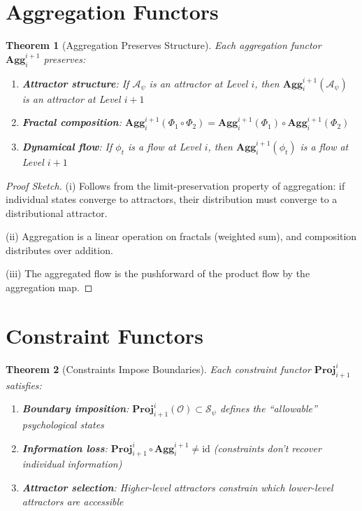 \documentclass[11pt,twoside]{book}
\newcommand{\Frac}{\Phi}
\newcommand{\PsychAttractor}{\mathcal{A}_\psi}
\newcommand{\Overton}{\mathcal{O}}
\newcommand{\Aggregate}[2]{\mathbf{Agg}_{#1}^{#2}}
\newcommand{\Project}[2]{\mathbf{Proj}_{#1}^{#2}}
\newtheorem{theorem}{Theorem}[chapter]
\begin{document}
\section{Aggregation Functors}

\begin{theorem}[Aggregation Preserves Structure]
\label{thm:agg-structure}
Each aggregation functor $\Aggregate{i}{i+1}$ preserves:
\begin{enumerate}[label=(\roman*)]
    \item \textbf{Attractor structure}: If $\PsychAttractor$ is an attractor at Level $i$,
          then $\Aggregate{i}{i+1}(\PsychAttractor)$ is an attractor at Level $i+1$
    \item \textbf{Fractal composition}: $\Aggregate{i}{i+1}(\Frac_1 \circ \Frac_2) =
          \Aggregate{i}{i+1}(\Frac_1) \circ \Aggregate{i}{i+1}(\Frac_2)$
    \item \textbf{Dynamical flow}: If $\phi_t$ is a flow at Level $i$, then
          $\Aggregate{i}{i+1}(\phi_t)$ is a flow at Level $i+1$
\end{enumerate}
\end{theorem}

\begin{proof}[Proof Sketch]
(i) Follows from the limit-preservation property of aggregation: if individual states
converge to attractors, their distribution must converge to a distributional attractor.

(ii) Aggregation is a linear operation on fractals (weighted sum), and composition
distributes over addition.

(iii) The aggregated flow is the pushforward of the product flow by the aggregation map.
\end{proof}

\section{Constraint Functors}

\begin{theorem}[Constraints Impose Boundaries]
\label{thm:constraint-bounds}
Each constraint functor $\Project{i+1}{i}$ satisfies:
\begin{enumerate}[label=(\roman*)]
    \item \textbf{Boundary imposition}: $\Project{i+1}{i}(\Overton) \subset \mathcal{S}_\psi$
          defines the ``allowable'' psychological states
    \item \textbf{Information loss}: $\Project{i+1}{i} \circ \Aggregate{i}{i+1} \neq \mathrm{id}$
          (constraints don't recover individual information)
    \item \textbf{Attractor selection}: Higher-level attractors constrain which lower-level
          attractors are accessible
\end{enumerate}
\end{theorem}
\end{document}
